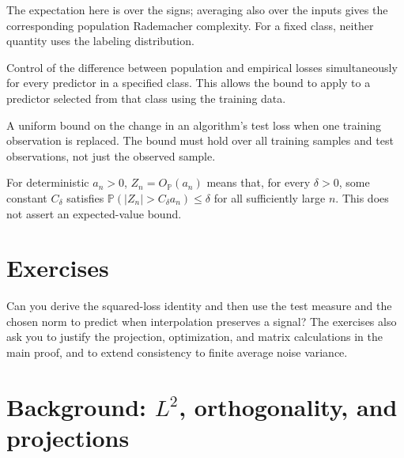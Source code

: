 \documentclass[11pt,twoside]{article}
\renewcommand{\P}{\mathbb P}
\theoremstyle{definition}
\theoremstyle{remark}
\renewcommand{\thesection}{9.\arabic{section}}
\begin{document}
\begin{description}[style=nextline,leftmargin=1.5em,labelindent=0pt]
The expectation here is over the signs; averaging also over the inputs
gives the corresponding population Rademacher complexity. For a fixed
class, neither quantity uses the labeling distribution.
\item[Uniform convergence]
Control of the difference between population and empirical losses
simultaneously for every predictor in a specified class. This allows
the bound to apply to a predictor selected from that class using the
training data.
\item[Uniform stability]
A uniform bound on the change in an algorithm's test loss when one
training observation is replaced. The bound must hold over all training
samples and test observations, not just the observed sample.
\item[Rate in probability $O_{\P}(a_n)$]
For deterministic $a_n>0$, $Z_n=O_{\P}(a_n)$ means that, for every
$\delta>0$, some constant $C_\delta$ satisfies
$\P(|Z_n|>C_\delta a_n)\le\delta$ for all sufficiently large $n$.
This does not assert an expected-value bound.
\end{description}

\section{Exercises}
\label{sec:exercises}

Can you derive the squared-loss identity and then use the test measure and the
chosen norm to predict when interpolation preserves a signal? The exercises
also ask you to justify the projection, optimization, and matrix calculations
in the main proof, and to extend consistency to finite average noise variance.

\exerciseinstructions
\setcounter{courseexercise}{0}













\appendix
\renewcommand{\thesection}{9.\Alph{section}}
\section{Background: $L^2$, orthogonality, and projections}
\label{app:l2-background}
\end{document}
